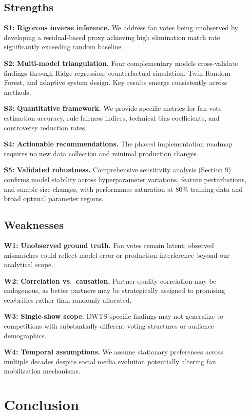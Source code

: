 \documentclass{mcmthesis}
\begin{document}
\subsection{Strengths}

\textbf{S1: Rigorous inverse inference.} We address fan votes being unobserved by developing a residual-based proxy achieving high elimination match rate significantly exceeding random baseline.

\textbf{S2: Multi-model triangulation.} Four complementary models cross-validate findings through Ridge regression, counterfactual simulation, Twin Random Forest, and adaptive system design. Key results emerge consistently across methods.

\textbf{S3: Quantitative framework.} We provide specific metrics for fan vote estimation accuracy, rule fairness indices, technical bias coefficients, and controversy reduction rates.

\textbf{S4: Actionable recommendations.} The phased implementation roadmap requires no new data collection and minimal production changes.

\textbf{S5: Validated robustness.} Comprehensive sensitivity analysis (Section 9) confirms model stability across hyperparameter variations, feature perturbations, and sample size changes, with performance saturation at 80\% training data and broad optimal parameter regions.

\subsection{Weaknesses}

\textbf{W1: Unobserved ground truth.} Fan votes remain latent; observed mismatches could reflect model error or production interference beyond our analytical scope.

\textbf{W2: Correlation vs.\ causation.} Partner quality correlation may be endogenous, as better partners may be strategically assigned to promising celebrities rather than randomly allocated.

\textbf{W3: Single-show scope.} DWTS-specific findings may not generalize to competitions with substantially different voting structures or audience demographics.

\textbf{W4: Temporal assumptions.} We assume stationary preferences across multiple decades despite social media evolution\cite{7} potentially altering fan mobilization mechanisms.

\section{Conclusion}
\end{document}
